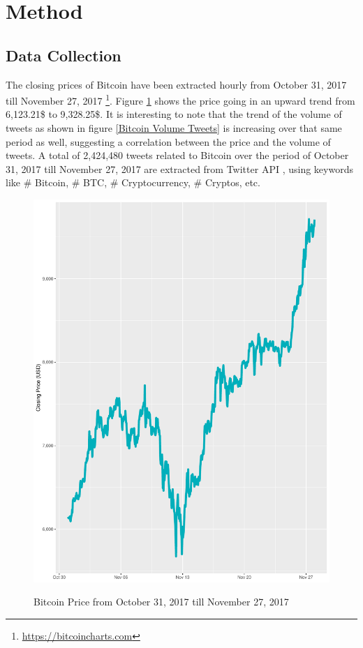 \documentclass[conference]{IEEEtran}
\begin{document}
\section{Method}

\subsection{Data Collection}
\par The closing prices of Bitcoin have been extracted hourly from October 31, 2017 till November 27, 2017 \footnote{\url{https://bitcoincharts.com}}. Figure \ref{Bitcoin Price} shows the price going in an upward trend from 6,123.21\$ to 9,328.25\$. It is interesting to note that the trend of the volume of tweets as shown in figure \ref{Bitcoin Volume Tweets} is increasing over that same period as well, suggesting a correlation between the price and the volume of tweets. A total of 2,424,480 tweets related to Bitcoin over the period  of October 31, 2017 till November 27, 2017 are extracted from Twitter API \cite{Twitter API}, using keywords like \# Bitcoin, \# BTC, \# Cryptocurrency, \# Cryptos, etc. 

\begin{minipage}{\linewidth}
\begin{figure}[H]
\centering
\caption{Bitcoin Price from October 31, 2017 till November 27, 2017} 
\includegraphics[scale=0.3]{Graphs/BitcoinPriceChart.pdf}
\label{Bitcoin Price} 
\end{figure}
\end{minipage}
\end{document}
